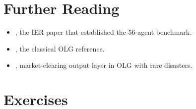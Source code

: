 \documentclass[11pt,a4paper]{report}
\begin{document}
\section*{Further Reading}
\begin{itemize}[itemsep=2pt]
\item \citet{azinovicDEEPEQUILIBRIUMNETS2022}, the IER paper that established the 56-agent benchmark.
\item \citet{auerbach1987dynamic}, the classical OLG reference.
\item \citet{azinoviczemlicka_2024}, market-clearing output layer in OLG with rare disasters.
\end{itemize}

\section*{Exercises}
\end{document}
